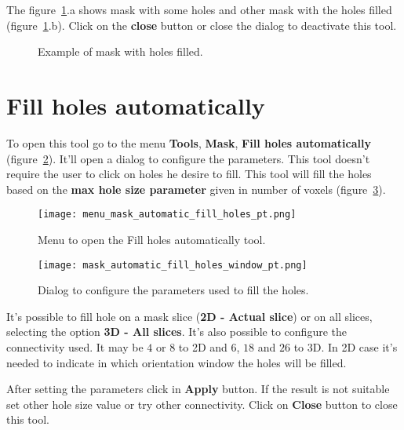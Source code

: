 The figure~\ref{fig:mask_fill_hole}.a shows mask with some holes and other mask with the holes filled (figure~\ref{fig:mask_fill_hole}.b). Click on the \textbf{close} button or close the dialog to deactivate this tool.

\begin{figure}[!htb]
  \centering
    \qquad
  \hfill
  \caption{Example of mask with holes filled.}
  \label{fig:mask_fill_hole}
\end{figure}


\section{Fill holes automatically}

To open this tool go to the menu \textbf{Tools}, \textbf{Mask}, \textbf{Fill holes automatically} (figure~\ref{fig:menu_mask_automatic_fill_holes}). It'll open a dialog to configure the parameters. This tool doesn't require the user to click on holes he desire to fill. This tool will fill the holes based on the \textbf{max hole size parameter} given in number of voxels (figure~\ref{fig:mask_automatic_fill_holes_window}).

\begin{figure}[!htb]
\centering
\texttt{[image: menu\_mask\_automatic\_fill\_holes\_pt.png]}
\caption{Menu to open the Fill holes automatically tool.}
\label{fig:menu_mask_automatic_fill_holes}
\end{figure}

\begin{figure}[!htb]
\centering
\texttt{[image: mask\_automatic\_fill\_holes\_window\_pt.png]}
\caption{Dialog to configure the parameters used to fill the holes.}
\label{fig:mask_automatic_fill_holes_window}
\end{figure}

It's possible to fill hole on a mask slice (\textbf{2D - Actual slice}) or on all slices, selecting the option \textbf{3D - All slices}. It's also possible to configure the connectivity used. It may be $4$ or $8$ to 2D and $6$, $18$ and $26$ to 3D. In 2D case it's needed to indicate in which orientation window the holes will be filled.

After setting the parameters click in \textbf{Apply} button. If the result is not suitable set other hole size value or try other connectivity. Click on \textbf{Close} button to close this tool.

